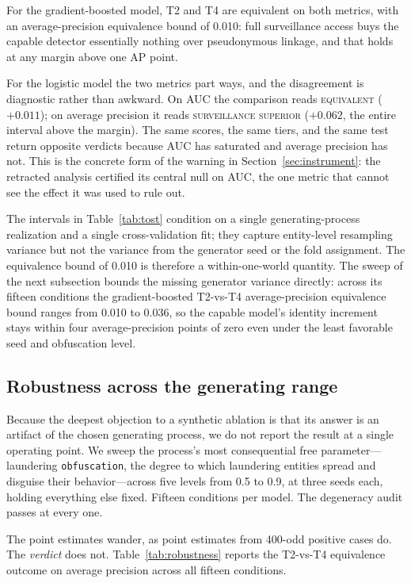 \documentclass[11pt]{article}
\begin{document}
For the gradient-boosted model, T2 and T4 are equivalent on both metrics, with an average-precision
equivalence bound of 0.010: full surveillance access buys the capable detector essentially nothing
over pseudonymous linkage, and that holds at any margin above one AP point.

For the logistic model the two metrics part ways, and the disagreement is diagnostic rather than
awkward. On AUC the comparison reads \textsc{equivalent} ($+0.011$); on average precision it reads
\textsc{surveillance superior} ($+0.062$, the entire interval above the margin). The same scores, the
same tiers, and the same test return opposite verdicts because AUC has saturated and average precision
has not. This is the concrete form of the warning in Section~\ref{sec:instrument}: the retracted
analysis certified its central null on AUC, the one metric that cannot see the effect it was used to
rule out.

The intervals in Table~\ref{tab:tost} condition on a single generating-process realization and a
single cross-validation fit; they capture entity-level resampling variance but not the variance from
the generator seed or the fold assignment. The equivalence bound of 0.010 is therefore a
within-one-world quantity. The sweep of the next subsection bounds the missing generator variance
directly: across its fifteen conditions the gradient-boosted T2-vs-T4 average-precision equivalence
bound ranges from 0.010 to 0.036, so the capable model's identity increment stays within four
average-precision points of zero even under the least favorable seed and obfuscation level.

\subsection{Robustness across the generating range}
\label{sec:robustness}

Because the deepest objection to a synthetic ablation is that its answer is an artifact of the chosen
generating process, we do not report the result at a single operating point. We sweep the process's
most consequential free parameter---laundering \texttt{obfuscation}, the degree to which laundering
entities spread and disguise their behavior---across five levels from 0.5 to 0.9, at three seeds each,
holding everything else fixed. Fifteen conditions per model. The degeneracy audit passes at every one.

The point estimates wander, as point estimates from 400-odd positive cases do. The \emph{verdict} does
not. Table~\ref{tab:robustness} reports the T2-vs-T4 equivalence outcome on average precision across
all fifteen conditions.
\end{document}
